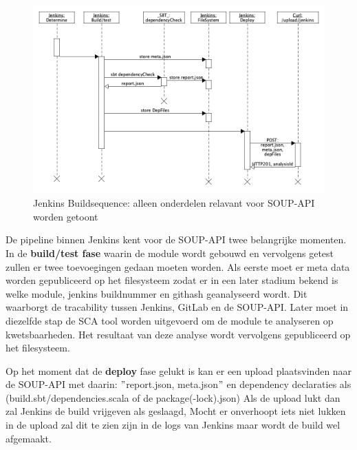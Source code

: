 \begin{figure}[bth]
    \myfloatalign
    \includegraphics[width=15cm]{gfx/umlet/exports/jenkinsBuildSequence}
    \caption{Jenkins Buildsequence: alleen onderdelen relavant voor SOUP-API worden getoont}
    \label{fig:JenkinsSequece}
\end{figure}

De pipeline binnen Jenkins kent voor de SOUP-API twee belangrijke momenten. In de \textbf{build/test fase} waarin de module wordt gebouwd en vervolgens getest zullen er twee toevoegingen gedaan moeten worden. Als eerste moet er meta data worden gepubliceerd op het filesysteem zodat er in een later stadium bekend is welke module, jenkins buildnummer en githash geanalyseerd wordt. Dit waarborgt de tracability tussen Jenkins, GitLab en de SOUP-API. Later moet in diezelfde stap de SCA tool worden uitgevoerd om de module te analyseren op kwetsbaarheden. Het resultaat van deze analyse wordt vervolgens gepubliceerd op het filesysteem.

Op het moment dat de \textbf{deploy} fase gelukt is kan er een upload plaatsvinden naar de SOUP-API met daarin: $"$report.json, meta.json$"$ en dependency declaraties als (build.sbt/dependencies.scala of de package(-lock).json)
Als de upload lukt dan zal Jenkins de build vrijgeven als geslaagd, Mocht er onverhoopt iets niet lukken in de upload zal dit te zien zijn in de logs van Jenkins maar wordt de build wel afgemaakt.


